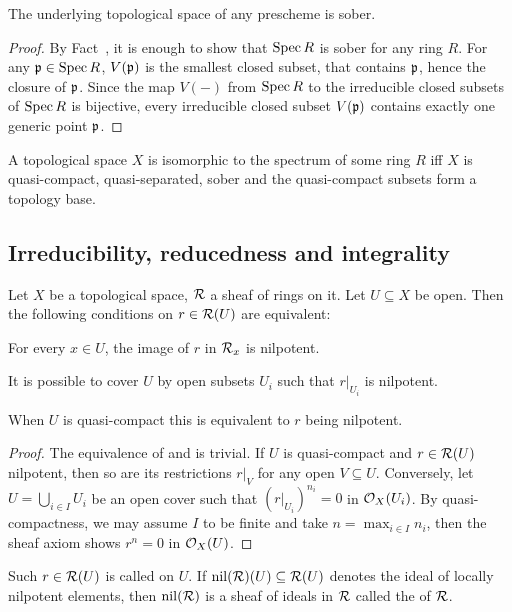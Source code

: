 \documentclass[a4paper,parskip=half,numbers=enddot, DIV=12]{scrreprt}
\begin{document}
\begin{fact}
    The underlying topological space of any prescheme is sober.
\end{fact}
\begin{proof}
	By Fact~, it is enough to show that $\operatorname{Spec} R$ is sober for any ring $R$. For any $\mathfrak{p}\in \operatorname{Spec} R$, $V(\mathfrak{p})$ is the smallest closed subset, that contains $\mathfrak{p}$, hence the closure of $\mathfrak{p}$. Since the map $V(-)$ from $\operatorname{Spec} R$ to the irreducible closed subsets of $\operatorname{Spec} R$ is bijective, every irreducible closed subset $V(\mathfrak{p})$ contains exactly one generic point $\mathfrak{p}$.
\end{proof}
\begin{thm}[M. Hochster]
    A topological space $X$ is isomorphic to the spectrum of some ring $R$ iff $X$ is quasi-compact, quasi-separated, sober and the quasi-compact subsets form a topology base.
\end{thm}


\subsection{Irreducibility, reducedness and integrality}

\begin{fact}
    Let $X$ be a topological space, $\mathcal{R}$ a sheaf of rings on it. Let $U\subseteq X$ be open. Then the following conditions on $r\in\mathcal{R}(U)$ are equivalent:
    \begin{alphanumerate}
    \item   
        For every $x\in U$, the image of $r$ in $\mathcal{R}_x$ is nilpotent.
    \item 
        It is possible to cover $U$ by open subsets $U_i$ such that $r|_{U_i}$ is nilpotent.
    \end{alphanumerate}
        When $U$ is quasi-compact this is equivalent to $r$ being nilpotent.
\end{fact}
\begin{proof}
	The equivalence of  and  is trivial. If $U$ is quasi-compact and $r\in\mathcal{R}(U)$ nilpotent, then so are its restrictions $r|_V$ for any open $V\subseteq U$. Conversely, let $U=\bigcup_{i\in I}U_i$ be an open cover such that $(r|_{U_i})^{n_i}=0$ in $\mathcal{O}_X(U_i)$. By quasi-compactness, we may assume $I$ to be finite and take $n=\max_{i\in I}n_i$, then the sheaf axiom shows $r^n=0$ in $\mathcal{O}_X(U)$.
\end{proof}

\begin{defi}
    Such $r\in \mathcal{R}(U)$ is called  on $U$. If $\operatorname{nil} (\mathcal{R})(U) \subseteq \mathcal{R}(U)$ denotes the ideal of locally nilpotent elements, then $\operatorname{nil}(\mathcal{R})$ is a sheaf of ideals in $\mathcal{R}$ called the  of $\mathcal{R}$.
\end{defi}
\end{document}
